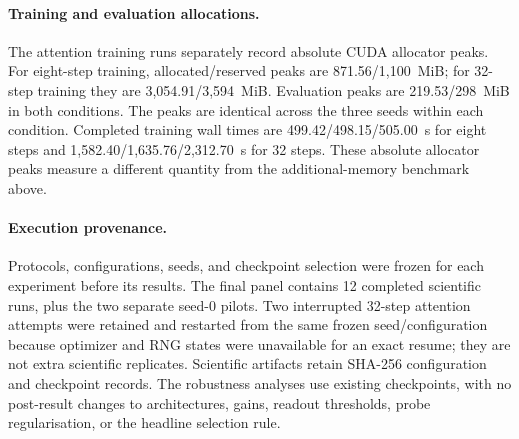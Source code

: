 \paragraph{Training and evaluation allocations.}
The attention training runs separately record absolute CUDA allocator peaks.
For eight-step training, allocated/reserved peaks are 871.56/1,100~MiB;
for 32-step training they are 3,054.91/3,594~MiB. Evaluation peaks are
219.53/298~MiB in both conditions. The peaks are identical across the three
seeds within each condition. Completed training wall times are
499.42/498.15/505.00~s for eight steps and
1,582.40/1,635.76/2,312.70~s for 32 steps. These absolute allocator peaks
measure a different quantity from the additional-memory benchmark above.

\paragraph{Execution provenance.}
Protocols, configurations, seeds, and checkpoint selection were frozen for
each experiment before its results. The final panel contains 12 completed
scientific runs, plus the two separate seed-0 pilots. Two interrupted
32-step attention attempts were retained and restarted from the same frozen
seed/configuration because optimizer and RNG states were unavailable for an
exact resume; they are not extra scientific replicates. Scientific artifacts
retain SHA-256 configuration and checkpoint records. The robustness analyses
use existing checkpoints, with no post-result changes to architectures,
gains, readout thresholds, probe regularisation, or the headline selection rule.

